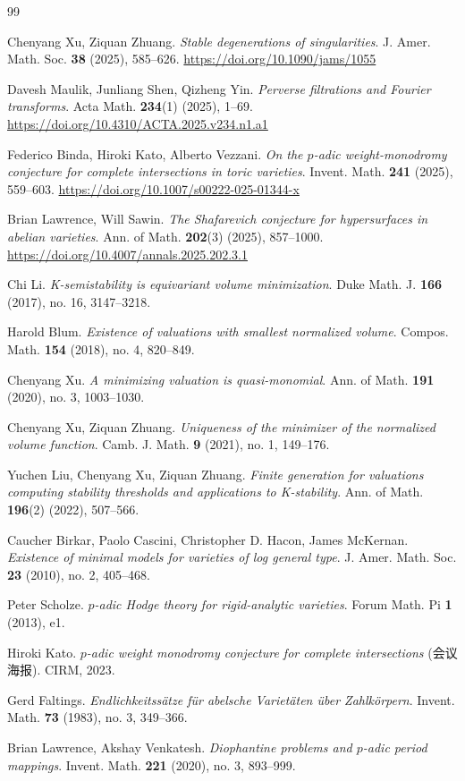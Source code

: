 \documentclass[11pt,a4paper]{article}
\theoremstyle{definition}
\theoremstyle{remark}
\begin{document}
\begin{thebibliography}{99}

Chenyang Xu, Ziquan Zhuang.
\emph{Stable degenerations of singularities}.
J. Amer. Math. Soc. \textbf{38} (2025), 585--626.
\url{https://doi.org/10.1090/jams/1055}

Davesh Maulik, Junliang Shen, Qizheng Yin.
\emph{Perverse filtrations and Fourier transforms}.
Acta Math. \textbf{234}(1) (2025), 1--69.
\url{https://doi.org/10.4310/ACTA.2025.v234.n1.a1}

Federico Binda, Hiroki Kato, Alberto Vezzani.
\emph{On the $p$-adic weight-monodromy conjecture for complete intersections in toric varieties}.
Invent. Math. \textbf{241} (2025), 559--603.
\url{https://doi.org/10.1007/s00222-025-01344-x}

Brian Lawrence, Will Sawin.
\emph{The Shafarevich conjecture for hypersurfaces in abelian varieties}.
Ann. of Math. \textbf{202}(3) (2025), 857--1000.
\url{https://doi.org/10.4007/annals.2025.202.3.1}

Chi Li.
\emph{K-semistability is equivariant volume minimization}.
Duke Math. J. \textbf{166} (2017), no. 16, 3147--3218.

Harold Blum.
\emph{Existence of valuations with smallest normalized volume}.
Compos. Math. \textbf{154} (2018), no. 4, 820--849.

Chenyang Xu.
\emph{A minimizing valuation is quasi-monomial}.
Ann. of Math. \textbf{191} (2020), no. 3, 1003--1030.

Chenyang Xu, Ziquan Zhuang.
\emph{Uniqueness of the minimizer of the normalized volume function}.
Camb. J. Math. \textbf{9} (2021), no. 1, 149--176.

Yuchen Liu, Chenyang Xu, Ziquan Zhuang.
\emph{Finite generation for valuations computing stability thresholds and applications to K-stability}.
Ann. of Math. \textbf{196}(2) (2022), 507--566.

Caucher Birkar, Paolo Cascini, Christopher D. Hacon, James M{c}Kernan.
\emph{Existence of minimal models for varieties of log general type}.
J. Amer. Math. Soc. \textbf{23} (2010), no. 2, 405--468.

Peter Scholze.
\emph{$p$-adic Hodge theory for rigid-analytic varieties}.
Forum Math. Pi \textbf{1} (2013), e1.

Hiroki Kato.
\emph{$p$-adic weight monodromy conjecture for complete intersections} (会议海报).
CIRM, 2023.

Gerd Faltings.
\emph{Endlichkeitss\"atze f\"ur abelsche Variet\"aten \"uber Zahlk\"orpern}.
Invent. Math. \textbf{73} (1983), no. 3, 349--366.

Brian Lawrence, Akshay Venkatesh.
\emph{Diophantine problems and $p$-adic period mappings}.
Invent. Math. \textbf{221} (2020), no. 3, 893--999.

\end{thebibliography}
\end{document}
